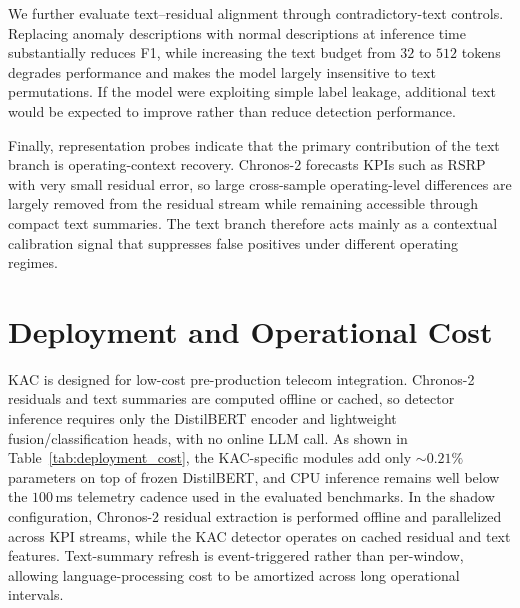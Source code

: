 \documentclass[conference]{IEEEtran}
\begin{document}
We further evaluate text--residual alignment through contradictory-text controls. Replacing anomaly descriptions with normal descriptions at inference time substantially reduces F1, while increasing the text budget from $32$ to $512$ tokens degrades performance and makes the model largely insensitive to text permutations. If the model were exploiting simple label leakage, additional text would be expected to improve rather than reduce detection performance.

Finally, representation probes indicate that the primary contribution of the text branch is operating-context recovery. Chronos-2 forecasts KPIs such as RSRP with very small residual error, so large cross-sample operating-level differences are largely removed from the residual stream while remaining accessible through compact text summaries. The text branch therefore acts mainly as a contextual calibration signal that suppresses false positives under different operating regimes.

\section{Deployment and Operational Cost}
\label{sec:deployment}

KAC is designed for low-cost pre-production telecom integration. Chronos-2 residuals and text summaries are computed offline or cached, so detector inference requires only the DistilBERT encoder and lightweight fusion/classification heads, with no online LLM call. As shown in Table~\ref{tab:deployment_cost}, the KAC-specific modules add only $\sim$$0.21\%$ parameters on top of frozen DistilBERT, and CPU inference remains well below the $100$\,ms telemetry cadence used in the evaluated benchmarks.
In the shadow configuration, Chronos-2 residual extraction is performed offline and parallelized across KPI streams, while the KAC detector operates on cached residual and text features. Text-summary refresh is event-triggered rather than per-window, allowing language-processing cost to be amortized across long operational intervals.
\end{document}
